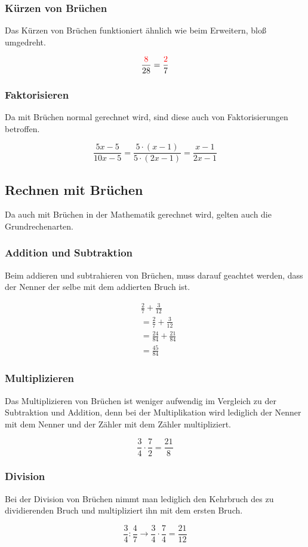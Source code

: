\subsubsection{Kürzen von Brüchen}
Das Kürzen von Brüchen funktioniert ähnlich wie beim Erweitern, bloß umgedreht.

\begin{beispiel}
	\[\frac{\color{red}8}{28}=\frac{\color{red}2}{7}\]
\end{beispiel}

\subsubsection{Faktorisieren} Da mit Brüchen normal gerechnet wird, sind diese auch von Faktorisierungen betroffen. 

\begin{beispiel}
	\[\frac{5x-5}{10x-5}=\frac{5\cdot(x-1)}{5\cdot(2x-1)}=\frac{x-1}{2x-1}\]
\end{beispiel}
\subsection{Rechnen mit Brüchen}\label{sec:Brueche/Rechen mit Bruechen}
Da auch mit Brüchen in der Mathematik gerechnet wird, gelten auch die Grundrechenarten.
\subsubsection{Addition und Subtraktion} Beim addieren und subtrahieren von Brüchen, muss darauf geachtet werden, dass der Nenner der selbe mit dem addierten Bruch ist. 

\begin{beispiel}
	\begin{align*}
		&\frac{2}{7}+\frac{3}{12}\\
		&=\frac{2}{7}+\frac{3}{12}\\
		&= \frac{24}{84}+\frac{21}{84}\\
		&= \frac{45}{84}
	\end{align*}	
\end{beispiel}
\subsubsection{Multiplizieren} Das Multiplizieren von Brüchen ist weniger aufwendig im Vergleich zu der Subtraktion und Addition, denn bei der Multiplikation wird lediglich der Nenner mit dem Nenner und der Zähler mit dem Zähler multipliziert.

\begin{beispiel}
	\[\frac{3}{4}\cdot\frac{7}{2}=\frac{21}{8}\]
\end{beispiel}
\subsubsection{Division} Bei der Division von Brüchen nimmt man lediglich den Kehrbruch des zu dividierenden Bruch und multipliziert ihn mit dem ersten Bruch. 

\begin{beispiel}
	\[\frac{3}{4}:\frac{4}{7} \rightarrow \frac{3}{4}\cdot \frac{7}{4}= \frac{21}{12}\]
\end{beispiel}